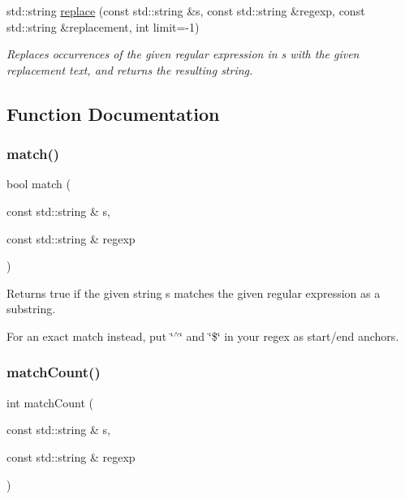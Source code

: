 \begin{DoxyCompactItemize}
std\+::string \mbox{\hyperlink{namespacesgl_1_1priv_1_1regexpr_aa2ddd568cd83beb5ee37c9891eda1011}{replace}} (const std\+::string \&s, const std\+::string \&regexp, const std\+::string \&replacement, int limit=-\/1)
\begin{DoxyCompactList}\small\item\em Replaces occurrences of the given regular expression in s with the given replacement text, and returns the resulting string. \end{DoxyCompactList}\end{DoxyCompactItemize}


\subsection{Function Documentation}
\mbox{\label{namespacesgl_1_1priv_1_1regexpr_ac209c2d2280a26805a88a5830572c4e8}} 
\subsubsection{\texorpdfstring{match()}{match()}}
{\footnotesize\ttfamily bool match (\begin{DoxyParamCaption}\item[{const std\+::string \&}]{s,  }\item[{const std\+::string \&}]{regexp }\end{DoxyParamCaption})}



Returns true if the given string s matches the given regular expression as a substring. 

For an exact match instead, put \char`\"{}$^\wedge$\char`\"{} and \char`\"{}\$\char`\"{} in your regex as start/end anchors. \mbox{\label{namespacesgl_1_1priv_1_1regexpr_ae0041d7f4268e3f1cc914a014b4c6966}} 
\subsubsection{\texorpdfstring{match\+Count()}{matchCount()}}
{\footnotesize\ttfamily int match\+Count (\begin{DoxyParamCaption}\item[{const std\+::string \&}]{s,  }\item[{const std\+::string \&}]{regexp }\end{DoxyParamCaption})}



